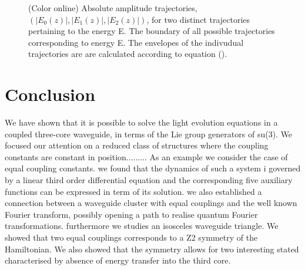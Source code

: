 \documentclass[9pt,twocolumn,twoside]{osajnl}
\begin{document}
\begin{figure}[htbp]
	\centering
	\caption{(Color online) Absolute amplitude trajectories, $(\vert E_{0}(z) \vert, \vert E_{1}(z) \vert, \vert E_{2}(z) \vert )$,  for two 
	distinct trajectories pertaining to 
	the energy E. The boundary 
	of all possible trajectories corresponding to energy E. The envelopes of the indivudual trajectories are are calculated according to equation ().} 
	 
	\label{fig: Fig4}
\end{figure}


\section{Conclusion}
We have shown that it is possible to solve the light evolution
equations in a coupled three-core waveguide, in terms of
the Lie group generators of su(3). We focused our attention on a
reduced class of structures where the coupling constants
are constant in position......... As an
example we consider the case of equal coupling constants.
we found that the dynamics of such a system i 
governed by a linear third order differential equation and the
corresponding five auxiliary functions can be expressed in term of its solution.
we also established a connection between a waveguide cluster
with equal couplings and the well known Fourier transform, possibly opening
a path to realise quantum Fourier transformations.
furthermore we studies an isosceles waveguide triangle.
We showed that two equal couplings corresponds to
a Z2 symmetry of the Hamiltonian. We also showed 
that the symmetry allows for two interesting stated
characterised by absence of energy transfer into the 
third core.









\end{document}
